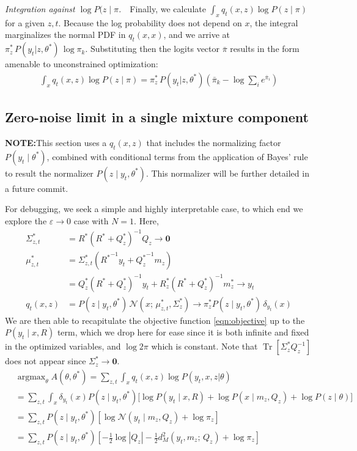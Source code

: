 \documentclass{article}         %
\DeclareMathOperator{\argmax}{\arg\max}
\newcommand{\inv}{^{-1}}
\newcommand{\NN}{\mathcal{N}}
\newcommand{\abs}[1]{\left| #1 \right|}
\newcommand{\pn}[1]{\left( #1 \right)}
\newcommand{\bc}[1]{\left[ #1 \right]}
\newcommand{\eps}{\varepsilon}
\DeclareMathOperator{\Tr}{Tr}
\begin{document}
\textit{Integration against $\log P(z \mid \pi$.}\ \ Finally, we calculate $\int_x q_t(x, z) \log P(z \mid \pi)$ for a given $z, t$. Because the log probability does not depend on $x$, the integral marginalizes the normal PDF in $q_t(x, x)$, and we arrive at $\pi_{z}^*\, P(y_t | z, \theta^*) \, \log \pi_k$. Substituting then the logits vector $\bar\pi$ results in the form amenable to unconstrained optimization:
\begin{align}
    \int_x q_t(x, z) \log P(z \mid \pi) = \pi_{z}^*\, P(y_t | z, \theta^*) \pn{ \bar\pi_k - \log\sum_i e^{\bar\pi_i} }
    \label{eq:obj-term-3}
\end{align}

\subsection{Zero-noise limit in a single mixture component}

\textbf{NOTE:}\quad This section uses a $q_t(x, z)$ that includes the normalizing factor $P(y_t\mid \theta^*)$, combined with conditional terms from the application of Bayes' rule to result the normalizer $P(z\mid y_t, \theta^*)$. This normalizer will be further detailed in a future commit.

For debugging, we seek a simple and highly interpretable case, to which end we explore the $\eps\rightarrow 0$ case with $N=1$. Here,
\begin{align}
    \Sigma_{z, t}^* &= R^* \pn{R^* + Q^*_{z}}\inv Q_{z} \rightarrow \mathbf{0} \\
    \mu_{z, t}^* &= \Sigma_{z, t}^* \pn{ {R^*}\inv y_t + {Q^*_z}\inv m_{z} } \\
    &= Q_z^* (R^* + Q_z^*)\inv y_t + R_z^* (R^* + Q_z^*)\inv m_z^* \rightarrow y_t \\
    q_t(x, z) &= P(z\mid y_t,\theta^*)\,\NN(x;\, \mu^*_{z,t}, \Sigma^*_z) \rightarrow \pi_z^* P(z\mid y_t,\theta^*)\,\delta_{y_t}(x)
\end{align}
We are then able to recapitulate the objective function \ref{eqn:objective} up to the $P(y_t \mid x, R)$ term, which we drop here for ease since it is both infinite and fixed in the optimized variables, and $\log2\pi$ which is constant. Note that $\Tr\bc{\Sigma_z^*Q_z\inv}$ does not appear since $\Sigma_z^* \rightarrow \mathbf{0}$.
\begin{align}
    &\argmax_\theta A(\theta, \theta^*) = \sum_{z, t} \int_x q_t(x, z)\log P(y_t, x, z | \theta) \\
    &= \sum_{z, t} \int_x \delta_{y_t}(x) P(z\mid y_t,\theta^*) \big[\log P(y_t \mid x, R) + \log P(x \mid m_z, Q_z) + \log P(z\mid \theta) \big] \\
    &= \sum_{z, t} P(z\mid y_t,\theta^*) \bc{\log \NN(y_t \mid m_z, Q_z) + \log \pi_z} \\
    &= \sum_{z, t} P(z\mid y_t,\theta^*) \bc{-\frac{1}{2}\log \abs{Q_z} - \frac{1}{2}d^2_M(y_t , m_z ;\, Q_z) + \log \pi_z}
\end{align}
\end{document}
